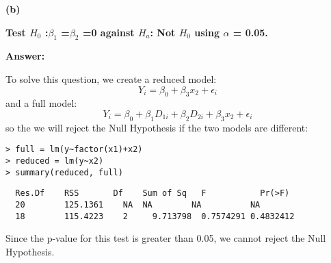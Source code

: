 \documentclass[letterpaper,11pt]{article}
\begin{document}
\bigbreak
\begin{addmargin}[-1.1em]{0em}
\textbf{(b)}\par\end{addmargin}
\textbf{Test $H_0$ :$\beta_1$ =$\beta_2$ =0 against $H_a$: Not $H_0$ using $\alpha$ = 0.05.}\par
\bigbreak
\begin{addmargin}[-0.5em]{0em}
\textbf{Answer: }\end{addmargin}

To solve this question, we create a reduced model:
$$Y_i =\beta_0 +\beta_3x_2 + \epsilon_i$$
and a full model:
$$Y_i =\beta_0 +\beta_1D_{1i} +\beta_2D_{2i} +\beta_3x_2 + \epsilon_i$$
so the we will reject the Null Hypothesis if the two models are different:

\begin{lstlisting}
> full = lm(y~factor(x1)+x2)
> reduced = lm(y~x2)
> summary(reduced, full)
\end{lstlisting}

\begin{lstlisting}
  Res.Df	RSS	      Df	Sum of Sq	F	        Pr(>F)
  20	    125.1361	NA	NA	      NA	      NA
  18	    115.4223	2	  9.713798	0.7574291 0.4832412
\end{lstlisting}

Since the p-value for this test is greater than 0.05, we cannot reject the Null Hypothesis.

\bigbreak
\end{document}
